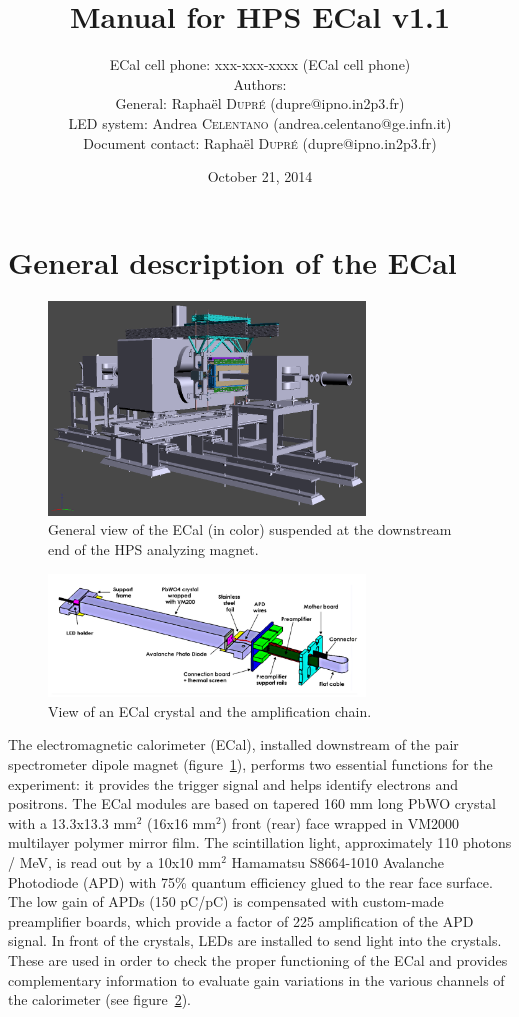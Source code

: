 \documentclass[12pt]{article}
\title{Manual for HPS ECal v1.1}
\author{ECal cell phone: xxx-xxx-xxxx (ECal cell phone) \\ 
Authors: \\
General: Rapha\"el \textsc{Dupr\'e} (dupre@ipno.in2p3.fr)\\ 
LED system: Andrea \textsc{Celentano} (andrea.celentano@ge.infn.it)\\
Document contact:
Rapha\"el \textsc{Dupr\'e} (dupre@ipno.in2p3.fr)\\ 
}
\date{October 21, 2014}
\begin{document}
\maketitle{}

   \section{General description of the ECal}

\begin{figure}
\center
\includegraphics[width=0.75\textwidth]{GView.png}
\caption{\small \label{GView} General view of the ECal (in color) suspended at the downstream end of the HPS analyzing magnet.}
\end{figure}

\begin{figure}
\center
\includegraphics[width=0.75\textwidth]{CrystalAssembly.png}
\caption{\small \label{AmplChain} View of an ECal crystal and the amplification chain.}
\end{figure}
      

The electromagnetic calorimeter (ECal), installed downstream of the pair spectrometer dipole magnet (figure~\ref{GView}), performs two essential functions for the experiment: it provides the trigger signal and helps identify electrons and positrons. The ECal modules are based on tapered 160 mm long PbWO crystal with a 13.3x13.3 mm$^2$ (16x16 mm$^2$) front (rear) face wrapped in VM2000 multilayer polymer mirror film. The scintillation light, approximately 110 photons / MeV, is read out by a 10x10 mm$^2$ Hamamatsu S8664-1010 Avalanche Photodiode (APD) with 75\% quantum efficiency glued to the rear face surface. The low gain of APDs (150 pC/pC) is compensated with custom-made preamplifier boards, which provide a factor of 225 amplification of the APD signal. In front of the crystals, LEDs are installed to send light into the crystals. These are used in order to check the proper functioning of the ECal and provides complementary information to evaluate gain variations in the various channels of the calorimeter (see figure~\ref{AmplChain}).
\end{document}
